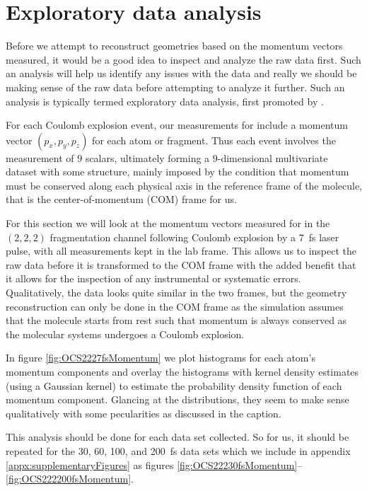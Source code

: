 \section{Exploratory data analysis}
Before we attempt to reconstruct geometries based on the momentum vectors measured, it would be a good idea to inspect and analyze the raw data first. Such an analysis will help us identify any issues with the data and really we should be making sense of the raw data before attempting to analyze it further. Such an analysis is typically termed exploratory data analysis, first promoted by \citet{Tukey77}.

For each Coulomb explosion event, our measurements for  include a momentum vector $(p_x, p_y, p_z)$ for each atom or fragment. Thus each event involves the measurement of $9$ scalars, ultimately forming a $9$-dimensional multivariate dataset with some structure, mainly imposed by the condition that momentum must be conserved along each physical axis in the reference frame of the molecule, that is the center-of-momentum (COM) frame for us.

For this section we will look at the momentum vectors measured for  in the $(2,2,2)$ fragmentation channel following Coulomb explosion by a \SI{7}{\fs} laser pulse, with all measurements kept in the lab frame. This allows us to inspect the raw data before it is transformed to the COM frame with the added benefit that it allows for the inspection of any instrumental or systematic errors. Qualitatively, the data looks quite similar in the two frames, but the geometry reconstruction can only be done in the COM frame as the simulation assumes that the molecule starts from rest such that momentum is always conserved as the molecular systems undergoes a Coulomb explosion.

In figure \ref{fig:OCS2227fsMomentum} we plot histograms for each atom's momentum components and overlay the histograms with kernel density estimates (using a Gaussian kernel) to estimate the probability density function of each momentum component. Glancing at the distributions, they seem to make sense qualitatively with some pecularities as discussed in the caption. 

This analysis should be done for each data set collected. So for us, it should be repeated for the 30, 60, 100, and \SI{200}{\fs} data sets which we include in appendix \ref{appx:supplementaryFigures} as figures \ref{fig:OCS22230fsMomentum}--\ref{fig:OCS222200fsMomentum}.

